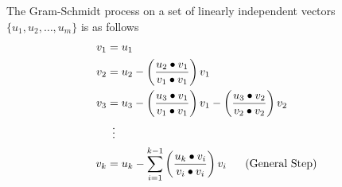 

The Gram-Schmidt process on a set of linearly independent vectors $\{ u_1, u_2, \ldots, u_m\}$ is as follows 
 \begin{equation}
 \label{eq:GramSchmidt}
 \begin{aligned}
 v_1 & = u_1 \\
 v_2 &= u_2 - \left(\frac{u_2 \bullet v_1}{v_1 \bullet v_1}\right) v_1 \bigskip \\
 v_3 &= u_3 -\left(\frac{u_3 \bullet v_1}{v_1 \bullet v_1}\right) v_1 - \left(\frac{u_3 \bullet v_2}{v_2 \bullet v_2}\right) v_2 \\
 & ~\vdots \\
	v_k &= u_k  - \sum_{i=1}^{k-1} \left(\frac{u_k \bullet v_i}{v_i \bullet v_i}\right) v_i~~~~~\text{(General Step)}
	\end{aligned}
\end{equation}

